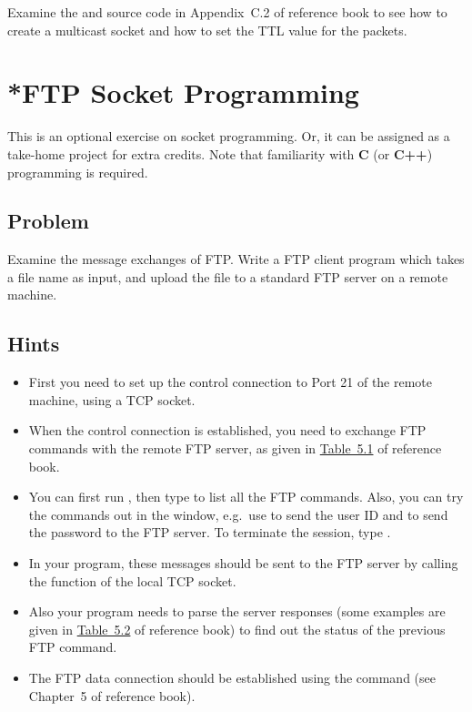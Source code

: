 \documentclass{../UTNetLab}
\begin{document}
    Examine the  and  source code in Appendix~C.2 of reference book to see how to create a multicast socket and how to set the TTL value for the packets.


\section{*FTP Socket Programming}
    This is an optional exercise on socket programming.
    Or, it can be assigned as a take-home project for extra credits.
    Note that familiarity with \textbf{C} (or \textbf{C++}) programming is required.

    \subsection*{Problem}
    Examine the message exchanges of FTP.
    Write a FTP client program which takes a file name as input, and upload the file to a standard FTP server on a remote machine.

    \subsection*{Hints}
    \begin{itemize}
        \item First you need to set up the control connection to Port 21 of the remote machine, using a TCP socket.
        \item When the control connection is established, you need to exchange FTP commands with the remote FTP server, as given in \hyperref[tab:5.1]{Table~5.1} of reference book.
        \item You can first run , then type  to list all the FTP commands.
        Also, you can try the commands out in the  window, e.g.\ use  to send the user ID and  to send the password to the FTP server.
        To terminate the  session, type .
        \item In your program, these messages should be sent to the FTP server by calling the  function of the local TCP socket.
        \item Also your program needs to parse the server responses (some examples are given in \hyperref[tab:5.2]{Table~5.2} of reference book) to find out the status of the previous FTP command.
        \item The FTP data connection should be established using the  command (see Chapter~5 of reference book).
    \end{itemize}
\end{document}
